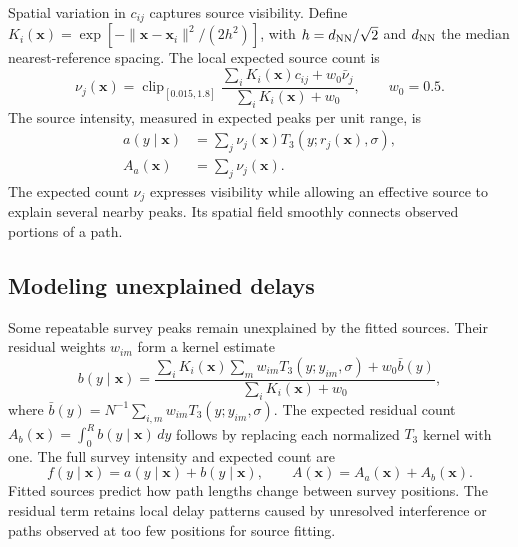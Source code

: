 \documentclass[conference]{IEEEtran}
\begin{document}
Spatial variation in \(c_{ij}\) captures source visibility. Define \(K_i(\bm x)=\exp[-\|\bm x-\bm x_i\|^2/(2h^2)]\), with \(h=d_{\rm NN}/\sqrt2\) and \(d_{\rm NN}\) the median nearest-reference spacing. The local expected source count is
\begin{equation}
\nu_j(\bm x)=\operatorname{clip}_{[0.015,1.8]}
\frac{\sum_iK_i(\bm x)c_{ij}+w_0\bar\nu_j}{\sum_iK_i(\bm x)+w_0},
\qquad w_0=0.5.
\label{eq:visibility}
\end{equation}
The source intensity, measured in expected peaks per unit range, is
\begin{align}
a(y\mid\bm x)&=\sum_j\nu_j(\bm x)T_3(y;r_j(\bm x),\sigma),\nonumber\\
A_a(\bm x)&=\sum_j\nu_j(\bm x).
\end{align}
The expected count $\nu_j$ expresses visibility while allowing an effective source to explain several nearby peaks. Its spatial field smoothly connects observed portions of a path.

\subsection{Modeling unexplained delays}
Some repeatable survey peaks remain unexplained by the fitted sources. Their residual weights \(w_{im}\) form a kernel estimate
\begin{equation}
b(y\mid\bm x)=\frac{\sum_iK_i(\bm x)\sum_mw_{im}T_3(y;y_{im},\sigma)
+w_0\bar b(y)}{\sum_iK_i(\bm x)+w_0},
\label{eq:residual}
\end{equation}
where \(\bar b(y)=N^{-1}\sum_{i,m}w_{im}T_3(y;y_{im},\sigma)\). The expected residual count \(A_b(\bm x)=\int_0^R b(y\mid\bm x)\,dy\) follows by replacing each normalized \(T_3\) kernel with one. The full survey intensity and expected count are
\begin{equation}
f(y\mid\bm x)=a(y\mid\bm x)+b(y\mid\bm x),\qquad
A(\bm x)=A_a(\bm x)+A_b(\bm x).
\end{equation}
Fitted sources predict how path lengths change between survey positions. The residual term retains local delay patterns caused by unresolved interference or paths observed at too few positions for source fitting.
\end{document}
